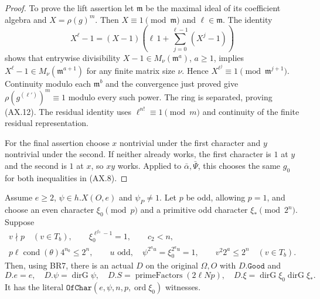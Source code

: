 \begin{proof}
To prove the lift assertion let $\mathfrak m$ be the maximal ideal
of its coefficient algebra and $X=\rho(g)^m$.  Then
$X\equiv1\pmod{\mathfrak m}$ and $\ell\in\mathfrak m$.
The identity
\[
 X^\ell-1=(X-1)\left(\ell\,1+
                   \sum_{j=0}^{\ell-1}(X^j-1)\right)
 \tag{AX.13}
\]
shows that entrywise divisibility $X-1\in M_\nu(\mathfrak m^a)$,
$a\ge1$, implies $X^\ell-1\in M_\nu(\mathfrak m^{a+1})$
for any finite matrix size $\nu$.
Hence $X^{\ell^j}\equiv1\pmod{\mathfrak m^{j+1}}$.
Continuity modulo each $\mathfrak m^b$ and the convergence just
proved give $\rho(g^{(\ell')})^m\equiv1$ modulo every such power.
The ring is separated, proving (AX.12).  The residual identity
uses $\ell^{n!}\equiv1\pmod m$ and continuity of the finite
residual representation.

For the final assertion choose $x$ nontrivial under the first
character and $y$ nontrivial under the second.  If neither already
works, the first character is $1$ at $y$ and the second is $1$
at $x$, so $xy$ works.  Applied to $\bar\alpha,\bar\Psi$, this
chooses the same $g_0$ for both inequalities in (AX.8).
\end{proof}

\begin{proposition}
\label{prop:ax-generic}
Assume $e\ge2$, $\psi\in h.X(O,e)$ and $\psi_P\ne1$.
Let $p$ be odd, allowing $p=1$, and choose an even character
$\xi_0\pmod p$ and a primitive odd character $\xi_*\pmod{2^n}$.
Suppose
\[
\begin{gathered}
 v\nmid p\quad(v\in T_b),\qquad
 \xi_0^{\ell^{f_0}-1}=1,\qquad c_2<n,\\
 p\ell\operatorname{cond}(\theta)4^{n_0}\le2^n,
 \qquad u\text{ odd},\quad
 \psi^{2^a u}=\xi_0^{2^a u}=1,\qquad
 v^2 2^a\le2^n\quad(v\in T_b).
\end{gathered}\tag{AX.14}
\]
Then, using BR7, there is an actual $D$ on the original $\Omega,O$
with $D.\mathtt{Good}$ and
\[
 D.e=e,\quad D.\psi=\operatorname{dirG}\psi,\quad
 D.S=\operatorname{primeFactors}(2\ell Np),\quad
 D.\xi=\operatorname{dirG}\xi_0\operatorname{dirG}\xi_*.
 \tag{AX.15}
\]
It has the literal $\mathtt{OfChar}(e,\psi,n,p,
\operatorname{ord}\xi_0)$ witnesses.
\end{proposition}


